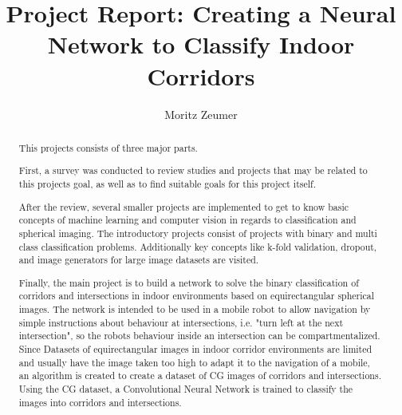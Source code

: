 \documentclass[sigconf]{acmart}
\begin{document}
\title[Project Report]{Project Report: Creating a Neural Network to Classify Indoor Corridors}

\author{Moritz Zeumer}

\renewcommand{\shortauthors}{Zeumer}

\begin{abstract}
This projects consists of three major parts.

First, a survey was conducted to review studies and projects that may be related to this projects goal, as well as to find suitable goals for this project itself.

After the review, several smaller projects are implemented to get to know basic concepts of machine learning and computer vision in regards to classification and spherical imaging.
The introductory projects consist of projects with binary and multi class classification problems.
Additionally key concepts like k-fold validation, dropout, and image generators for large image datasets are visited.

Finally, the main project is to build a network to solve the binary classification of corridors and intersections in indoor environments based on equirectangular spherical images.
The network is intended to be used in a mobile robot to allow navigation by simple instructions about behaviour at intersections, i.e. "turn left at the next intersection", so the robots behaviour inside an intersection can be compartmentalized.
Since Datasets of equirectangular images in indoor corridor environments are limited and usually have the image taken too high to adapt it to the navigation of a mobile, an algorithm is created to create a dataset of CG images of corridors and intersections.
Using the CG dataset, a Convolutional Neural Network is trained to classify the images into corridors and intersections.
\end{abstract}

\keywords{}

\maketitle
\end{document}

